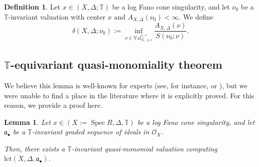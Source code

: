 \documentclass[a4paper,12pt]{amsart}
\newtheorem{lemma}[theorem]{Lemma}
\theoremstyle{definition} %
\newtheorem{definition}[theorem]{Definition}
\theoremstyle{remark}
\numberwithin{equation}{section}
\def\Spec{\operatorname{Spec}}
\begin{document}
\begin{definition} \label{definition}
Let $x\in (X,\Delta;\mathbb{T})$ be a log Fano cone singularity, and let $\nu_0$ be a $\mathbb{T}$-invariant valuation with center $x$ and $A_{X,\Delta}(\nu_0)<\infty$. We define
$$ \delta(X,\Delta;\nu_0):=\inf_{\nu\in \mathrm{Val}^{\mathbb{T},*}_{X,\ni x}}\frac{A_{X,\Delta}(\nu)}{S(\nu_0;\nu)}.$$
\end{definition}

\subsection{{$\mathbb{T}$-equivariant quasi-monomiality theorem}}
We believe this lemma is well-known for experts (see, for instance, \cite[Remark 3.9]{BLXZ23} or \cite[Proof of Theorem 1.1]{Wan25}), but we were unable to find a place in the literature where it is explicitly proved. For this reason, we provide a proof here.

\begin{lemma} \label{hevensteelyard}
Let $x\in (X:=\Spec R,\Delta,\mathbb{T})$ be a log Fano cone singularity, and let $\mathfrak{a}_{\bullet}$ be a $\mathbb{T}$-invariant graded sequence of ideals in $\mathcal{O}_X$.

\smallskip

Then, there exists a $\mathbb{T}$-invariant quasi-monomial valuation computing $\mathrm{lct}(X,\Delta,\mathfrak{a}_{\bullet})$.
\end{lemma}
\end{document}
